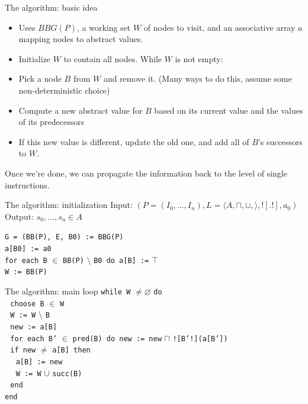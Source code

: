 \documentclass{beamer}
\begin{document}
\begin{frame}{The algorithm: basic idea}
\begin{itemize}
\item Uses $BBG(P)$, a working set $W$ of nodes to visit, and an
associative array $a$ mapping nodes to abstract values.
\item Initialize $W$ to contain all nodes. While $W$ is not empty:
\item Pick a node $B$ from $W$ and remove it. (Many ways to do this, assume
some non-deterministic choice)
\item Compute a new abstract value for $B$ based on its current value and
the values of its predecessors
\item If this new value is different, update the old one, and add all of 
$B$'s successors to $W$.
\end{itemize}
Once we're done, we can propagate the information back to the level of
single instructions.
\end{frame}

\begin{frame}{The algorithm: initialization}
Input: $(P = (I_0,\dots,I_n), L = \langle A, \sqcap, \sqcup, \rangle, ![.!], a_0)$ \\
Output: $s_0, \dots, s_n \in A$ 

\bigskip
{\tt G = (BB(P), E, B0) := BBG(P)} \\
{\tt a[B0] := a0} \\
{\tt for each B} $\in$ {\tt BB(P)} $\setminus$ {\tt B0 do a[B] :=} $\top$ \\
{\tt W := BB(P)}
\end{frame}

\begin{frame}{The algorithm: main loop}
\smallskip
{\tt while W} $\neq \varnothing$ {\tt do} \\
$\, \,$ {\tt choose B} $\in$ {\tt W} \\
$\, \,$ {\tt W := W} $\setminus$ {\tt B} \\
$\, \,$ {\tt new := a[B]} \\
$\, \,$ {\tt for each B'} $\in$ {\tt pred(B) do new := new} $\sqcap$ {\tt ![B'!](a[B'])} \\
$\, \,$ {\tt if new} $\neq$ {\tt a[B] then} \\
$\, \, \, \, \, \,$ {\tt a[B] := new} \\
$\, \, \, \, \, \,$ {\tt W := W} $\cup$ {\tt succ(B)} \\ 
$\, \,$ {\tt end} \\
{\tt end}
\end{frame}
\end{document}
